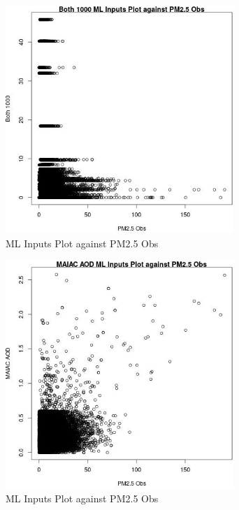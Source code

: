 \begin{figure} 
\centering  
\includegraphics[width=0.77\textwidth]{Code_Outputs/Report_ML_input_PM25_Step4_part_e_de_duplicated_aves_Both_1000vPM25_Obs.jpg} 
\caption{\label{fig:Report_ML_input_PM25_Step4_part_e_de_duplicated_avesBoth_1000vPM25_Obs}ML Inputs Plot against PM2.5 Obs} 
\end{figure} 
 

\begin{figure} 
\centering  
\includegraphics[width=0.77\textwidth]{Code_Outputs/Report_ML_input_PM25_Step4_part_e_de_duplicated_aves_MAIAC_AODvPM25_Obs.jpg} 
\caption{\label{fig:Report_ML_input_PM25_Step4_part_e_de_duplicated_avesMAIAC_AODvPM25_Obs}ML Inputs Plot against PM2.5 Obs} 
\end{figure} 
 

